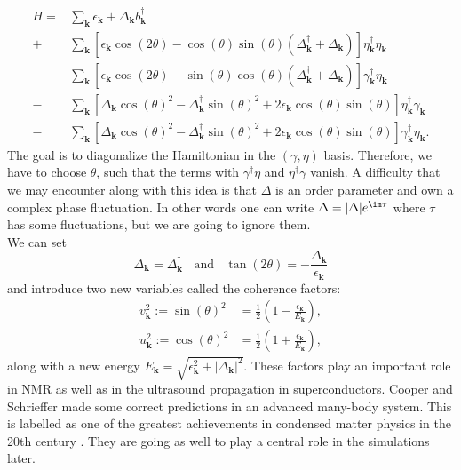 \documentclass[../main.tex]{subfile}
\begin{document}
\begin{equation}
    \begin{aligned}
        H =& \sum_{\bm{k}} \epsilon_{\bm{k}} + \Delta_{\bm{k}}b_{\bm{k}}^{\dagger}\\
          +& \sum_{\bm{k}} \left[\epsilon_{\bm{k}}\cos(2\theta) - \cos(\theta)\sin(\theta)\left(\Delta_{\bm{k}}^{\dagger}+ \Delta_{\bm{k}}\right)\right] \eta_{\bm{k}}^{\dagger}\eta_{\bm{k}}\\
          -& \sum_{\bm{k}} \left[\epsilon_{\bm{k}}\cos(2\theta) -\sin(\theta)\cos(\theta)\left(\Delta_{\bm{k}}^{\dagger}+ \Delta_{\bm{k}}\right)\right]\gamma^{\dagger}_{\bm{k}}\eta_{\bm{k}}\\
          -& \sum_{\bm{k}} \left[\Delta_{\bm{k}} \cos(\theta)^2 - \Delta_{\bm{k}}^{\dagger}\sin(\theta)^2 + 2\epsilon_{\bm{k}} \cos(\theta)\sin(\theta) \right]\eta^{\dagger}_{\bm{k}}\gamma_{\bm{k}}\\
          -& \sum_{\bm{k}} \left[\Delta_{\bm{k}} \cos(\theta)^2 - \Delta_{\bm{k}}^{\dagger}\sin(\theta)^2 + 2\epsilon_{\bm{k}} \cos(\theta)\sin(\theta) \right]\gamma^{\dagger}_{\bm{k}}\eta_{\bm{k}}.     
    \end{aligned}
\end{equation}
The goal is to diagonalize the Hamiltonian in the $(\gamma, \eta)$ basis. Therefore, we have to choose $\theta$, such that the terms with $\gamma^{\dagger}\eta$ and $\eta^{\dagger}\gamma$ vanish.
A difficulty that we may encounter along with this idea is that $\Delta$ is an order parameter and own a complex phase fluctuation. In other words one can write
$\Delta = |\Delta|e^{\im\tau}$ where $\tau$ has some fluctuations, but we are going to ignore them.\\

We can set
\begin{equation*}
    \Delta_{\bm{k}} = \Delta_{\bm{k}}^{\dagger}~~~~ \text{and} ~~~~ \tan(2\theta) = -\frac{\Delta_{\bm{k}}}{\epsilon_{\bm{k}}}
\end{equation*}
and introduce two new variables called the coherence factors:
\begin{align}
    v_{\bm{k}}^2 := \sin(\theta)^2 &= \frac{1}{2} \left(1 - \frac{\epsilon_{\bm{k}}}{E_{\bm{k}}}\right), \label{eq:coherenceFac_v}\\
    u_{\bm{k}}^2 := \cos(\theta)^2 &= \frac{1}{2} \left(1 + \frac{\epsilon_{\bm{k}}}{E_{\bm{k}}}\right)  \label{eq:coherenceFac_u},
\end{align}
along with a new energy $E_{\bm{k}} = \sqrt{\epsilon_{\bm{k}}^2 + |\Delta_{\bm{k}}|^2}$. These factors play an important
role in NMR as well as in the ultrasound propagation in superconductors. Cooper and Schrieffer made some correct
predictions in an advanced many-body system. This is labelled as one of the greatest achievements in condensed matter physics in the 20th century \cite{FossheimSudbo2004}.
They are going as well to play a central role in the simulations later.\\
\end{document}
